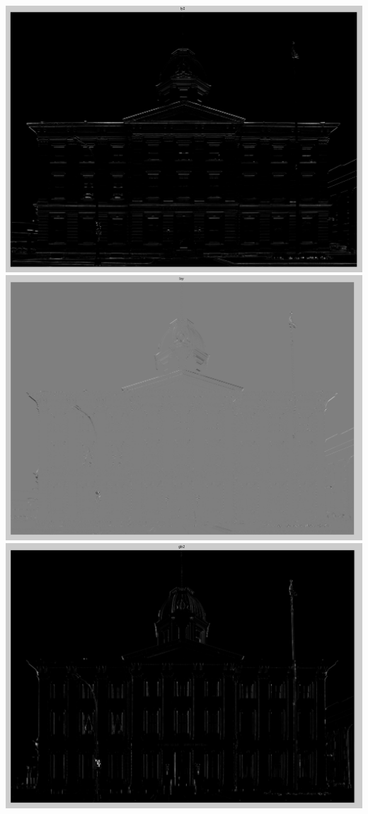 \documentclass[11pt]{article}
\begin{document}
\includegraphics[scale=0.5]{Iy2}
\includegraphics[scale=0.5]{Ixy}
\includegraphics[scale=0.5]{glx2}
\end{document}
